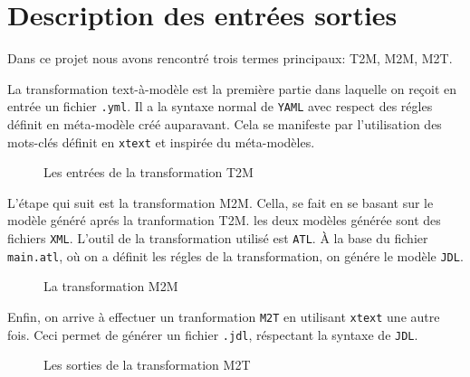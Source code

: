
\section{Description des entrées sorties}

Dans ce projet nous avons rencontré trois termes principaux: T2M, M2M,
M2T.

La transformation text-à-modèle est la première partie dans laquelle
on reçoit en entrée un fichier \texttt{.yml}. Il a la syntaxe normal
de \texttt{YAML} avec respect des régles définit en méta-modèle créé
auparavant. Cela se manifeste par l'utilisation des mots-clés définit
en \texttt{xtext} et inspirée du méta-modèles.

\begin{figure}[H]
  \begin{center}
      \caption{Les entrées de la transformation T2M}
  \end{center}
\end{figure}

L'étape qui suit est la transformation M2M. Cella, se fait en se
basant sur le modèle généré aprés la tranformation T2M. les deux
modèles générée sont des fichiers \texttt{XML}. L'outil de la
transformation utilisé est \texttt{ATL}. À la base du fichier
\texttt{main.atl}, où on a définit les régles de la transformation, on
génére le modèle \texttt{JDL}.

\begin{figure}[H]
  \begin{center}
      \caption{La transformation M2M}
  \end{center}
\end{figure}

Enfin, on arrive à effectuer un tranformation \texttt{M2T} en
utilisant \texttt{xtext} une autre fois. Ceci permet de générer un
fichier \texttt{.jdl}, réspectant la syntaxe de \texttt{JDL}.

\begin{figure}[H]
  \begin{center}
      \caption{Les sorties de la transformation M2T}
  \end{center}
\end{figure}

